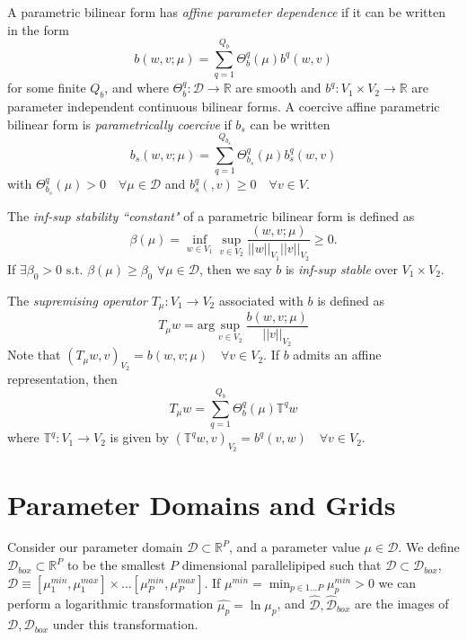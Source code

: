 A parametric bilinear form has \textit{affine parameter dependence} if it can be written in the form 
\begin{equation}
b(w,v; \mu) = \sum^{Q_b}_{q=1} \Theta^q_b(\mu) b^q(w,v)
\end{equation}
for some finite $Q_b$, and where $\Theta^q_b:\mathcal{D}\rightarrow \mathbb{R}$ are smooth and $b^q: V_1 \times V_2 \rightarrow \mathbb{R}$ are parameter independent continuous bilinear forms. A coercive affine parametric bilinear form is \textit{parametrically coercive} if $b_s$ can be written 
\[ b_s(w,v; \mu) = \sum^{Q_{b_s}}_{q=1} \Theta^q_{b_s}(\mu) b_s^q(w,v) \]
with $\Theta^q_{b_s}(\mu)>0 \quad \forall \mu \in \mathcal{D}$ and $b^q_s(,v) \geq 0 \quad \forall v \in V$.

The \textit{inf-sup stability ``constant"} of a parametric bilinear form is defined as 
\begin{equation}
\beta(\mu)=\inf_{w \in V_1} \sup_{v \in V_2} \frac{(w,v;\mu)}{||w||_{V_1} ||v||_{V_2}}\geq 0.
\end{equation}
If $\exists \beta_0 > 0 \mbox{ s.t. } \beta(\mu)\geq \beta_0$ $\forall \mu \in \mathcal{D}$, then we say $b$ is \textit{inf-sup stable} over $V_1 \times V_2$.

The \textit{supremising operator} $T_\mu : V_1 \rightarrow V_2$ associated with $b$ is defined as 
\begin{equation}
T_\mu w = \mbox{arg} \sup_{v\in V_2} \frac{b(w,v;\mu)}{||v||_{V_2}}
\end{equation}
Note that $(T_\mu w,v)_{V_2}=b(w,v;\mu) \quad \forall v \in V_2$. If $b$ admits an affine representation, then
\begin{equation}
T_\mu w = \sum_{q=1}^{Q_b} \Theta^q_b (\mu) \mathbb{T}^q w
\end{equation}
where $\mathbb{T}^q : V_1 \rightarrow V_2$ is given by $( \mathbb{T}^q w,v)_{V_2}=b^q (v,w) \quad \forall v \in V_2$.

\section{Parameter Domains and Grids}
Consider our parameter domain $\mathcal{D}\subset \mathbb{R}^P$, and a parameter value $\mu \in \mathcal{D}$.  We define $\mathcal{D}_{box} \subset \mathbb{R}^P$ to be the smallest $P$ dimensional parallelipiped such that $\mathcal{D} \subset \mathcal{D}_{box}$, $\mathcal{D}\equiv [\mu_1^{min},\mu_1^{max}]\times \dots [\mu_P^{min},\mu_P^{max}]$. If $\mu^{min}=\min_{p \in 1 \dots P} \mu_p^{min} > 0$ we can perform a logarithmic transformation $\hat{\mu_p}=\ln \mu_p$, and $\hat{\mathcal{D}}, \hat{\mathcal{D}}_{box}$ are the images of $\mathcal{D}, \mathcal{D}_{box}$ under this transformation. 

